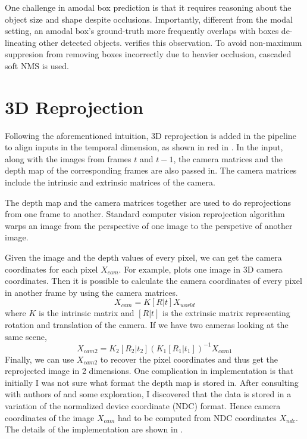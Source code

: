 One challenge in amodal box prediction is that it requires reasoning about the object size and shape despite occlusions. Importantly, different from the modal setting, an amodal box’s ground-truth more frequently overlaps with boxes de-lineating other detected objects.  verifies this observation. To avoid non-maximum suppresion from removing boxes incorrectly due to heavier occlusion, cascaded soft NMS is used.




\section{3D Reprojection}
Following the aforementioned intuition, 3D reprojection is added in the pipeline to align inputs in the temporal dimension, as shown in red in . In the input, along with the images from frames $t$ and $t-1$, the camera matrices and the depth map of the corresponding frames are also passed in. The camera matrices include the intrinsic and extrinsic matrices of the camera.

The depth map and the camera matrices together are used to do reprojections from one frame to another. Standard computer vision reprojection algorithm warps an image from the perspective of one image to the perspetive of another image.

Given the image and the depth values of every pixel, we can get the camera coordinates for each pixel $X_{cam}$. For example,  plots one image in 3D camera coordinates. Then it is possible to calculate the camera coordinates of every pixel in another frame by using the camera matrices. $$ X_{cam} = K[R|t]X_{world} $$ where $K$ is the intrinsic matrix and $[R|t]$ is the extrinsic matrix representing rotation and translation of the camera. If we have two cameras looking at the same scene, $$X_{cam2} = K_2[R_2|t_2](K_1[R_1|t_1])^{-1}X_{cam1}$$ Finally, we can use $X_{cam2}$ to recover the pixel coordinates and thus get the reprojected image in 2 dimensions. One complication in implementation is that initially I was not sure what format the depth map is stored in. After consulting with authors of \cite{hu2019sail} and some exploration, I discovered that the data is stored in a variation of the normalized device coordinate (NDC) format. Hence camera coordinates of the image $X_{cam}$ had to be computed from NDC coordinates $X_{ndc}$. The details of the implementation are shown in . 

